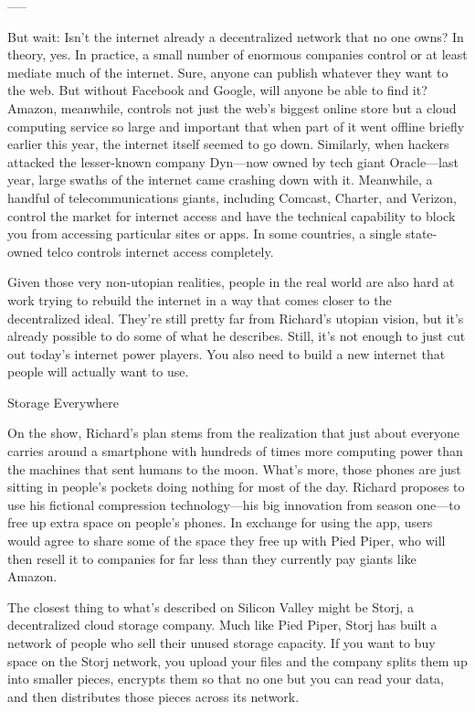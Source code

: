 \documentclass{tnreport}
\begin{document}
-----

But wait: Isn't the internet already a decentralized network that no one owns? In theory, yes. In practice, a small number of enormous companies control or at least mediate much of the internet. Sure, anyone can publish whatever they want to the web. But without Facebook and Google, will anyone be able to find it? Amazon, meanwhile, controls not just the web's biggest online store but a cloud computing service so large and important that when part of it went offline briefly earlier this year, the internet itself seemed to go down. Similarly, when hackers attacked the lesser-known company Dyn—now owned by tech giant Oracle—last year, large swaths of the internet came crashing down with it. Meanwhile, a handful of telecommunications giants, including Comcast, Charter, and Verizon, control the market for internet access and have the technical capability to block you from accessing particular sites or apps. In some countries, a single state-owned telco controls internet access completely.

Given those very non-utopian realities, people in the real world are also hard at work trying to rebuild the internet in a way that comes closer to the decentralized ideal. They're still pretty far from Richard's utopian vision, but it's already possible to do some of what he describes. Still, it's not enough to just cut out today's internet power players. You also need to build a new internet that people will actually want to use.

Storage Everywhere

On the show, Richard's plan stems from the realization that just about everyone carries around a smartphone with hundreds of times more computing power than the machines that sent humans to the moon. What's more, those phones are just sitting in people's pockets doing nothing for most of the day. Richard proposes to use his fictional compression technology—his big innovation from season one—to free up extra space on people's phones. In exchange for using the app, users would agree to share some of the space they free up with Pied Piper, who will then resell it to companies for far less than they currently pay giants like Amazon.

The closest thing to what's described on Silicon Valley might be Storj, a decentralized cloud storage company. Much like Pied Piper, Storj has built a network of people who sell their unused storage capacity. If you want to buy space on the Storj network, you upload your files and the company splits them up into smaller pieces, encrypts them so that no one but you can read your data, and then distributes those pieces across its network.
\end{document}
